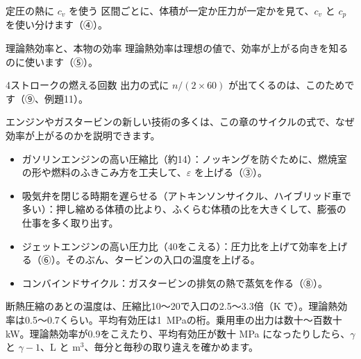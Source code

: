 \begin{tsumazuki}{定圧の熱に $c_v$ を使う}
区間ごとに、体積が一定か圧力が一定かを見て、$c_v$ と $c_p$ を使い分けます（④）。
\end{tsumazuki}

\begin{tsumazuki}{理論熱効率と、本物の効率}
理論熱効率は理想の値で、効率が上がる向きを知るのに使います（⑤）。
\end{tsumazuki}

\begin{tsumazuki}{4ストロークの燃える回数}
出力の式に $n/(2\times60)$ が出てくるのは、このためです（⑨、例題11）。
\end{tsumazuki}

\begin{phkougaku}
エンジンやガスタービンの新しい技術の多くは、この章のサイクルの式で、なぜ効率が上がるのかを説明できます。
\begin{itemize}[leftmargin=2\zw, itemsep=1pt, topsep=2pt]
\item ガソリンエンジンの高い圧縮比（約14）：ノッキングを防ぐために、燃焼室の形や燃料のふきこみ方を工夫して、$\varepsilon$ を上げる（③）。
\item 吸気弁を閉じる時期を遅らせる（アトキンソンサイクル、ハイブリッド車で多い）：押し縮める体積の比より、ふくらむ体積の比を大きくして、膨張の仕事を多く取り出す。
\item ジェットエンジンの高い圧力比（40をこえる）：圧力比を上げて効率を上げる（⑥）。そのぶん、タービンの入口の温度を上げる。
\item コンバインドサイクル：ガスタービンの排気の熱で蒸気を作る（⑧）。
\end{itemize}

\begin{phketa}[エンジンとガスタービンの数]
断熱圧縮のあとの温度は、圧縮比10〜20で入口の2.5〜3.3倍（K で）。理論熱効率は0.5〜0.7くらい。平均有効圧は\qty{1}{MPa}の桁。乗用車の出力は数十〜百数十 kW。理論熱効率が0.9をこえたり、平均有効圧が数十 MPa になったりしたら、$\gamma$ と $\gamma-1$、L と m$^3$、毎分と毎秒の取り違えを確かめます。
\end{phketa}
\end{phkougaku}

